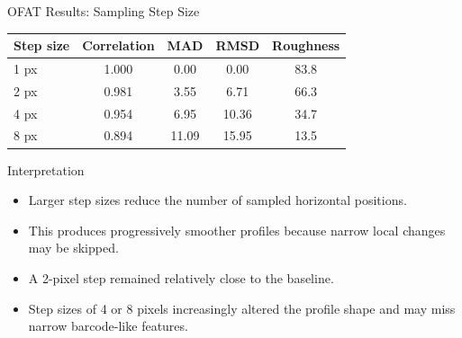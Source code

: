 \documentclass[aspectratio=169]{beamer}
\begin{document}
\begin{frame}{OFAT Results: Sampling Step Size}

\small

\begin{table}
\centering
\begin{tabular}{lcccc}
\toprule
Step size &
Correlation &
MAD &
RMSD &
Roughness\\
\midrule
1 px & 1.000 & 0.00 & 0.00 & 83.8\\
2 px & 0.981 & 3.55 & 6.71 & 66.3\\
4 px & 0.954 & 6.95 & 10.36 & 34.7\\
8 px & 0.894 & 11.09 & 15.95 & 13.5\\
\bottomrule
\end{tabular}
\end{table}

\vspace{0.3cm}

\begin{block}{Interpretation}

\begin{itemize}
    \item Larger step sizes reduce the number of sampled horizontal positions.
    \item This produces progressively smoother profiles because narrow local
    changes may be skipped.
    \item A 2-pixel step remained relatively close to the baseline.
    \item Step sizes of 4 or 8 pixels increasingly altered the profile shape
    and may miss narrow barcode-like features.
\end{itemize}

\end{block}

\end{frame}
\end{document}
